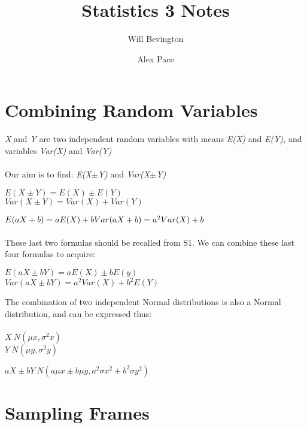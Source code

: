 \documentclass{article}
\title{Statistics 3 Notes}
\author{Will Bevington \and Alex Pace}
\begin{document}
	\maketitle
    \tableofcontents
    \newpage
	\section{Combining Random Variables}
		\textit{X} and \textit{Y} are two independent random variables with means \textit{E(X)} and \textit{E(Y)}, and variables \textit{Var(X)} and \textit{Var(Y)} \\\\ 
        Our aim is to find: \textit{E(X$\pm$Y)} and \textit{Var(X$\pm$Y)} \\
		\begin{center}
        		$E(X\pm Y) = E(X) \pm E(Y) $ \\ $Var(X\pm Y) = Var(X) + Var(Y)$
        	\end{center}
        $E(aX + b) = aE(X) + b \\ Var(aX + b) = a^2Var(X) + b$ \\\\ These last two formulas should be recalled from S1. We can combine these last four formulas to acquire:
        	\begin{center}
			$E(aX\pm bY) = aE(X)\pm bE(y)$ \\ $Var(aX\pm bY) = a^2Var(X)+b^2E(Y)$
		\end{center}
        	The combination of two independent Normal distributions is also a Normal distribution, and can be expressed thus: \\\\
        $X~N(\mu x , \sigma^2x)$ \\ $Y~N(\mu y , \sigma^2 y)$
        	\begin{center}
			$aX\pm bY~N(a\mu x\pm b\mu y , a^2\sigma x^2+b^2\sigma y^2)$
		\end{center}
	\section{Sampling Frames}
\end{document}
